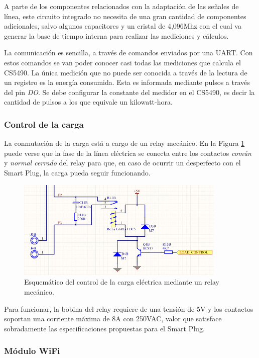 A parte de los componentes relacionados con la adaptación de las señales de línea, este circuito integrado  no necesita de una gran cantidad de componentes adicionales, salvo algunos capacitores y un cristal de 4,096Mhz con el cual va generar la base de tiempo interna para realizar las mediciones y cálculos.

La comunicación es sencilla, a través de comandos enviados por una UART. Con estos comandos se van poder conocer casi todas las mediciones que calcula el CS5490. La única medición que no puede ser conocida a través de la lectura de un registro es la energía consumida. Esta es informada mediante pulsos a través del pin \textit{DO}. Se debe configurar la constante del medidor en el CS5490, es decir la cantidad de pulsos a los que equivale un kilowatt-hora.


\subsubsection{Control de la carga}

La conmutación de la carga está a cargo de un relay mecánico. En la Figura \ref{fig:pcb_control_carga} puede verse que la fase de la línea eléctrica se conecta entre los contactos \textit{común} y \textit{normal cerrado} del relay para que, en caso de ocurrir un desperfecto con el Smart Plug, la carga pueda seguir funcionando.

\begin{figure}[h]
	\centering
	\includegraphics[width=10cm]{./Figures/3_1_2_pcb_control_carga.png}
	\caption{Esquemático del control de la carga eléctrica mediante un relay mecánico.}
	\label{fig:pcb_control_carga}
\end{figure}

Para funcionar, la bobina del relay requiere de una tensión de 5V y los contactos soportan una corriente máxima de 8A con 250VAC, valor que satisface sobradamente las especificaciones propuestas para el Smart Plug.

\subsubsection{Módulo WiFi}

